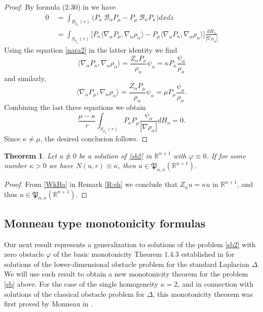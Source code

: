 \documentclass[11pt]{amsart}
\theoremstyle{plain}
\newtheorem{thrm}{Theorem}[section]
\numberwithin{equation}{section}
\begin{document}
\begin{proof}
By formula (2.30) in \cite{G} we have
\begin{align*}
0\ & = \int_{B_{\rho_\alpha}(r)} \big(P_\kappa\ {\mathcal{B}_\alpha} P_\mu - P_\mu\ {\mathcal{B}_\alpha} P_\kappa\big) dx dz
\\
& = \int_{{S_{\rho_\alpha}(r)}} \bigg[P_\kappa\langle{\nabla_\alpha} P_\mu,{\nabla_\alpha} {\rho_\alpha}\rangle - P_\mu\langle{\nabla_\alpha} P_\kappa,{\nabla_\alpha} {\rho_\alpha}\rangle \bigg]\frac{dH_{n}}{|\nabla {\rho_\alpha}|}
\end{align*}
Using the equation \eqref{nara2} in the latter identity we find
\[
\langle{\nabla_\alpha} P_\kappa,{\nabla_\alpha} {\rho_\alpha}\rangle = \frac{{Z_\alpha} P_\kappa}{\rho_\alpha} \psi_\alpha =  \kappa P_\kappa \frac{\psi_\alpha}{\rho_\alpha}
\]
and similarly,
\[
\langle{\nabla_\alpha} P_\mu,{\nabla_\alpha} {\rho_\alpha}\rangle = \frac{{Z_\alpha} P_\mu}{\rho_\alpha} \psi_\alpha = \mu P_\mu \frac{\psi_\alpha}{\rho_\alpha}.
\]
Combining the last three equations we obtain
\[
\frac{\mu - \kappa}{r} \int_{{S_{\rho_\alpha}(r)}} P_\kappa P_\mu \frac{\psi_\alpha}{|\nabla {\rho_\alpha}|}dH_{n} = 0.
\]
Since $\kappa\not= \mu$, the desired conclusion follows.

\end{proof}

\begin{thrm}\label{T:N=k-B}
 Let $u\not\equiv 0$ be a solution of \eqref{sb2} in ${\mathbb R}^{n+1}$ with ${\varphi} \equiv 0$. If for some number $\kappa> 0$ we have $N(u,r)\equiv \kappa$, then $u\in \mathfrak P_{\alpha,\kappa}({\mathbb R}^{n+1})$.
\end{thrm}

\begin{proof}
From \eqref{WkBa} in Remark \ref{R:sh} we conclude that ${Z_\alpha} u = \kappa u$ in ${\mathbb R}^{n+1}$, and thus $u\in \mathfrak P_{\alpha,\kappa}({\mathbb R}^{n+1})$.

\end{proof}

\subsection{Monneau type monotonicity formulas}\label{SS:monneau}

Our next result represents a generalization to solutions of the problem \eqref{sb2} with zero obstacle ${\varphi}$ of the basic monotonicity Theorem 1.4.3 established in \cite{GP} for solutions of the lower-dimensional obstacle problem for the standard Laplacian $\Delta$. We will use such result to obtain a new monotonicity theorem for the problem \eqref{sb} above. For the case of the single homogeneity $\kappa = 2$, and in connection with solutions of the classical obstacle problem for $\Delta$, this monotonicity theorem was first proved by Monneau in \cite{M}.
\end{document}
